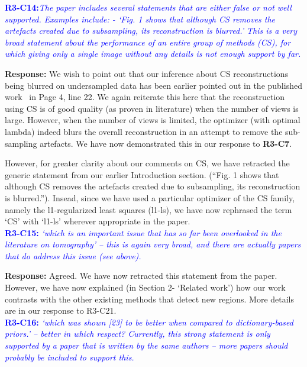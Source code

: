 \documentclass{article}
\begin{document}
\textcolor{blue}{\textbf{R3-C14:}\textit{The paper includes several statements that are either false or not well supported. Examples include:    - `Fig. 1 shows that although CS removes the artefacts created due to subsampling, its reconstruction is blurred.' This is a very broad statement about the performance of an entire group of methods (CS), for which giving only a single image without any details is not enough support by far.}}

\textbf{Response:} We wish to point out that our inference about CS reconstructions being blurred on undersampled data has been earlier pointed out in the published work~\cite{PICCS} in Page 4, line 22.  We again reiterate this here that the reconstruction using CS is of good quality (as proven in literature) when the number of views is large. However, when the number of views is limited, the optimizer (with optimal lambda) indeed blurs the overall reconstruction in an attempt to remove the sub-sampling artefacts. We have now demonstrated this in our response to \textbf{R3-C7}.

However, for greater clarity about our comments on CS, we have retracted the generic statement from our earlier Introduction section. (``Fig. 1 shows that although CS removes the artefacts created due to subsampling, its reconstruction is blurred.''). Insead, since we have used a particular optimizer of the CS family, namely the l1-regularized least squares (l1-ls), we have now rephrased the term `CS'  with `l1-ls' wherever appropriate in the paper.\\


\textcolor{blue}{\textbf{R3-C15:}\textit{ `which is an important issue that has so far been overlooked in the literature on tomography' -- this is again very broad, and there are actually papers that do address this issue (see above).}}

\textbf{Response:} Agreed. We have now retracted this statement from the paper. However, we have now explained (in Section 2- `Related work') how our work contrasts with the other existing methods that detect new regions. More details are in our response to R3-C21.\\
 
\textcolor{blue}{\textbf{R3-C16:}\textit{ `which was shown [23] to be better when compared to dictionary-based priors.' -- better in which respect? Currently, this strong statement is only supported by a paper that is written by the same authors -- more papers should probably be included to support this.}}
\end{document}
